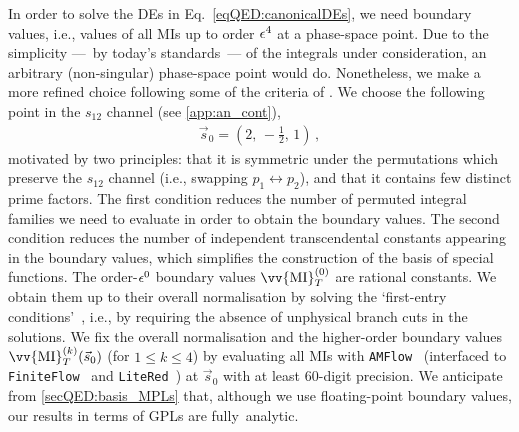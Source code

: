 \documentclass[main.tex]{subfiles}
\begin{document}
In order to solve the DEs in Eq.~\ref{eqQED:canonicalDEs}, we need boundary values, i.e., values of all MIs up to order $\epsilon^4$ at a phase-space point. Due to the simplicity ---~by today's standards~--- of the integrals under consideration, an arbitrary (non-singular) phase-space point would do. Nonetheless, we make a more refined choice following some of the criteria of .
We choose the following point in the $s_{12}$ channel (see \cref{app:an_cont}),
\begin{align} \label{eqQED:s0}
\vec{s}_0 = \left( 2, \, -\frac{1}{2}, \, 1 \right) \,,
\end{align}
motivated by two principles: that it is symmetric under the permutations which preserve the $s_{12}$ channel (i.e., swapping $p_1 \leftrightarrow p_2$), and that it contains few distinct prime factors.
The first condition reduces the number of permuted integral families we need to evaluate in order to obtain the boundary values.
The second condition reduces the number of independent transcendental constants appearing in the boundary values, which simplifies the construction of the basis of special functions. 
The order-$\epsilon^0$ boundary values $\vv{\text{MI}}_T^{(0)}$ are rational constants. We obtain them up to their overall normalisation by solving the `first-entry conditions'~\cite{Gaiotto:2011dt}, i.e., by requiring the absence of unphysical branch cuts in the solutions. We fix the overall normalisation and the higher-order boundary values $\vv{\text{MI}}_T^{(k)}(\vec{s}_0)$ (for $1\le k\le 4$) by evaluating all MIs with \texttt{AMFlow}~\cite{Liu:2022chg} (interfaced to 
\texttt{FiniteFlow}~\cite{Peraro:2019svx} and \texttt{LiteRed}~\cite{Lee:2012cn}) at $\vec{s}_0$ with at least $60$-digit precision.
We anticipate from \cref{secQED:basis_MPLs} that, although we use floating-point boundary values, our results in terms of GPLs are fully~analytic. 
\end{document}
